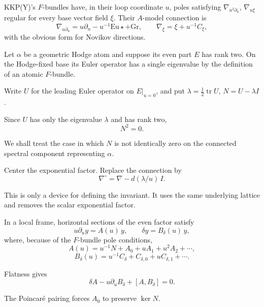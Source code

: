\documentclass[11pt]{article}
\theoremstyle{definition}
\theoremstyle{remark}
\begin{document}
KKP(Y)'s $F$-bundles have, in their loop coordinate $u$, poles satisfying
$\nabla_{u^2\partial_u}$, $\nabla_{u\xi}$ regular for every base vector field
$\xi$. Their $A$-model connection is
\[
  \nabla_{u\partial_u}=u\partial_u-u^{-1}\mathrm{Eu}\star+\mathrm{Gr},
  \qquad
  \nabla_\xi=\xi+u^{-1}C_\xi,
\]
with the obvious form for Novikov directions.

Let $\alpha$ be a geometric Hodge atom and suppose its even part $E$ has rank
two. On the Hodge-fixed base its Euler operator has a single eigenvalue by the
definition of an atomic $F$-bundle.

Write $U$ for the leading Euler operator on $E|_{u=0}$, and put
$\lambda=\tfrac12\operatorname{tr}U$, $N=U-\lambda I$.

Since $U$ has only the eigenvalue $\lambda$ and has rank two,
\begin{equation}
  N^2=0.
  \tag{1}
\end{equation}

We shall treat the case in which $N$ is not identically zero on the connected
spectral component representing $\alpha$.

Center the exponential factor. Replace the connection by
\begin{equation}
  \nabla^\circ=\nabla-d(\lambda/u)\,I.
  \tag{2}
\end{equation}

This is only a device for defining the invariant. It uses the same underlying
lattice and removes the scalar exponential factor.

In a local frame, horizontal sections of the even factor satisfy
\begin{equation}
  u\partial_u y=A(u)\,y,\qquad \delta y=B_\delta(u)\,y,
  \tag{3}
\end{equation}
where, because of the $F$-bundle pole conditions,
\begin{equation}
  A(u)=u^{-1}N+A_0+uA_1+u^2A_2+\cdots,
  \tag{4}
\end{equation}
\begin{equation}
  B_\delta(u)=u^{-1}C_\delta+C_{\delta,0}+uC_{\delta,1}+\cdots.
  \tag{5}
\end{equation}

Flatness gives
\begin{equation}
  \delta A-u\partial_uB_\delta+[A,B_\delta]=0.
  \tag{6}
\end{equation}

The Poincar\'e pairing forces $A_0$ to preserve $\ker N$.
\end{document}
